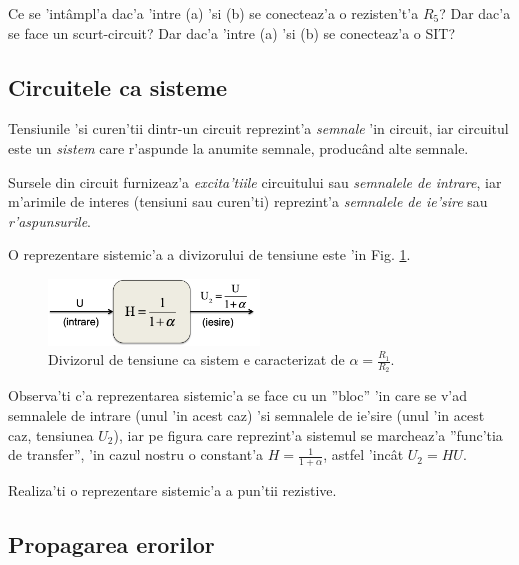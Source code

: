 \begin{exercise}
Ce se 'int\^ampl'a dac'a 'intre (a) 'si (b) se conecteaz'a o rezisten't'a $R_5$? Dar dac'a se face un scurt-circuit? Dar dac'a 'intre (a) 'si (b) se conecteaz'a o SIT?
\end{exercise}

\subsection*{Circuitele ca sisteme}\label{subsection:ca_sisteme}

Tensiunile 'si curen'tii dintr-un circuit reprezint'a \textit{semnale} 'in circuit, iar circuitul este un \textit{sistem} care r'aspunde la anumite semnale, produc\^and alte semnale.

Sursele din circuit furnizeaz'a \textit{excita'tiile} circuitului sau \textit{semnalele de intrare}, iar m'arimile de interes (tensiuni sau curen'ti) reprezint'a \textit{semnalele de ie'sire} sau \textit{r'aspunsurile}.

O reprezentare sistemic'a a divizorului de tensiune este 'in Fig. \ref{fig:divizor_tensiune_gol_sistem}.

\begin{figure}
	\centering
		\includegraphics[width=0.5\textwidth]{laborator_01/figuri/divizor_tensiune_gol_sistem}
	\caption{Divizorul de tensiune ca sistem e caracterizat de $\alpha = \frac{R_1}{R_2}$.}
	\label{fig:divizor_tensiune_gol_sistem}
\end{figure}

Observa'ti c'a reprezentarea sistemic'a se face cu un ''bloc'' 'in care se v'ad semnalele de intrare (unul 'in acest caz) 'si semnalele de ie'sire (unul 'in acest caz, tensiunea $U_2$), iar pe figura care reprezint'a sistemul se marcheaz'a ''func'tia de transfer'', 'in cazul nostru o constant'a $H = \frac{1}{1+\alpha}$, astfel 'inc\^at $U_2 = HU$.

\begin{exercise}
  Realiza'ti o reprezentare sistemic'a a pun'tii rezistive.
\end{exercise}


\subsection*{Propagarea erorilor}

